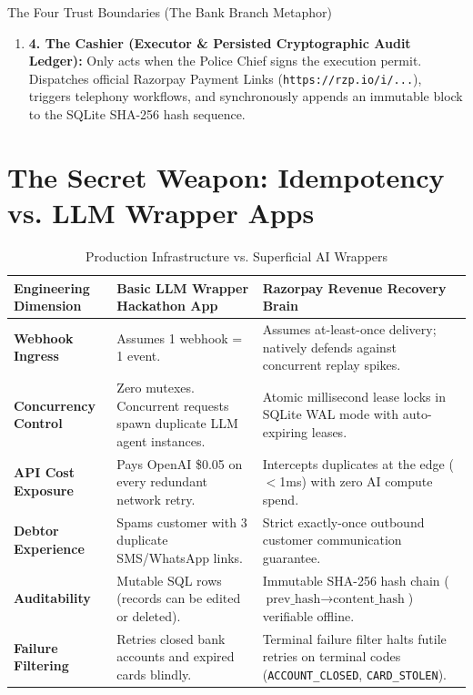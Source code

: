 \documentclass[11pt, a4paper]{article}
\begin{document}
\begin{calloutbox}{The Four Trust Boundaries (The Bank Branch Metaphor)}
\begin{enumerate}[leftmargin=1.5em, itemsep=6pt]
  \item \textbf{4. The Cashier (Executor \& Persisted Cryptographic Audit Ledger):}
  Only acts when the Police Chief signs the execution permit. Dispatches official Razorpay Payment Links (\texttt{https://rzp.io/i/...}), triggers telephony workflows, and synchronously appends an immutable block to the SQLite SHA-256 hash sequence.
\end{enumerate}
\end{calloutbox}

\section{The Secret Weapon: Idempotency vs. LLM Wrapper Apps}

\begin{table}[h!]
\centering
\small
\renewcommand{\arraystretch}{1.3}
\begin{tabularx}{\textwidth}{l p{5.2cm} X}
\toprule
\textbf{Engineering Dimension} & \textbf{Basic LLM Wrapper Hackathon App} & \textbf{Razorpay Revenue Recovery Brain} \\
\midrule
\textbf{Webhook Ingress} & Assumes 1 webhook = 1 event. & Assumes at-least-once delivery; natively defends against concurrent replay spikes. \\
\textbf{Concurrency Control} & Zero mutexes. Concurrent requests spawn duplicate LLM agent instances. & Atomic millisecond lease locks in SQLite WAL mode with auto-expiring leases. \\
\textbf{API Cost Exposure} & Pays OpenAI \$0.05 on every redundant network retry. & Intercepts duplicates at the edge ($<$1ms) with zero AI compute spend. \\
\textbf{Debtor Experience} & Spams customer with 3 duplicate SMS/WhatsApp links. & Strict exactly-once outbound customer communication guarantee. \\
\textbf{Auditability} & Mutable SQL rows (records can be edited or deleted). & Immutable SHA-256 hash chain ($\text{prev\_hash} \rightarrow \text{content\_hash}$) verifiable offline. \\
\textbf{Failure Filtering} & Retries closed bank accounts and expired cards blindly. & Terminal failure filter halts futile retries on terminal codes (\texttt{ACCOUNT\_CLOSED}, \texttt{CARD\_STOLEN}). \\
\bottomrule
\end{tabularx}
\caption{Production Infrastructure vs. Superficial AI Wrappers}
\end{table}
\end{document}

